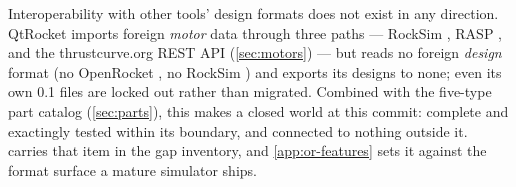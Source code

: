 Interoperability with other tools' design formats does not exist in any direction.
QtRocket imports foreign \emph{motor} data through three paths --- RockSim ,
RASP , and the thrustcurve.org REST API (\cref{sec:motors}) --- but reads no
foreign \emph{design} format (no OpenRocket , no RockSim ) and
exports its designs to none; even its own 0.1 files are locked out rather than migrated.
Combined with the five-type part catalog (\cref{sec:parts}), this makes  a
closed world at this commit: complete and exactingly tested within its boundary, and
connected to nothing outside it.  carries that item in the gap
inventory, and \cref{app:or-features} sets it against the format surface a mature
simulator ships.
